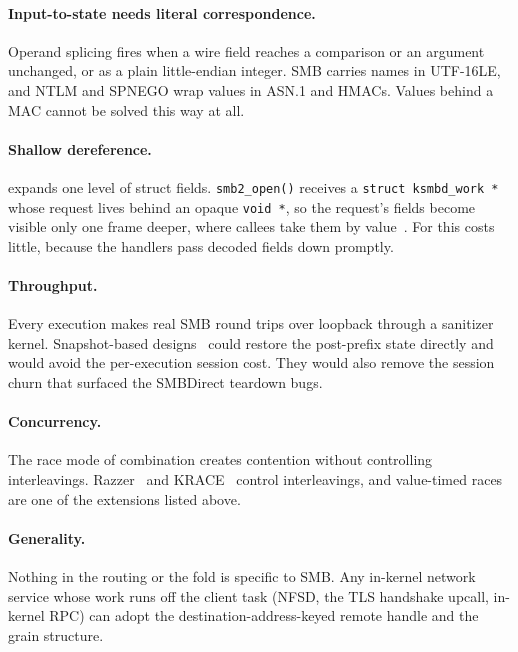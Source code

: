 \documentclass{article}
\begin{document}
\paragraph{Input-to-state needs literal correspondence.} Operand splicing
fires when a wire field reaches a comparison or an argument unchanged, or as a
plain little-endian integer. SMB carries names in UTF-16LE, and NTLM and
SPNEGO wrap values in ASN.1 and HMACs. Values behind a MAC cannot be solved
this way at all.

\paragraph{Shallow dereference.} \kcovdf expands one level of struct fields.
\texttt{smb2\_open()} receives a \texttt{struct ksmbd\_work *} whose request
lives behind an opaque \texttt{void *}, so the request's fields become visible
only one frame deeper, where callees take them by value~\cite{kim2026kcovdataflow}.
For \ksmbd this costs little, because the handlers pass decoded fields down
promptly.

\paragraph{Throughput.} Every execution makes real SMB round trips over
loopback through a sanitizer kernel. Snapshot-based
designs~\cite{schumilo2021nyx,song2020agamotto,schumilo2022nyxnet} could
restore the post-prefix state directly and would avoid the per-execution
session cost. They would also remove the session churn that surfaced the
SMBDirect teardown bugs.

\paragraph{Concurrency.} The race mode of combination creates contention
without controlling interleavings. Razzer~\cite{jeong2019razzer} and
KRACE~\cite{xu2020krace} control interleavings, and value-timed races are
one of the extensions listed above.

\paragraph{Generality.} Nothing in the routing or the fold is specific to SMB.
Any in-kernel network service whose work runs off the client task (NFSD, the
TLS handshake upcall, in-kernel RPC) can adopt the
destination-address-keyed remote handle and the grain structure.
\end{document}
